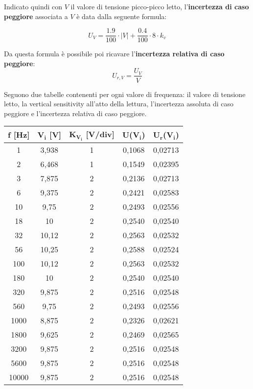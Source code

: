 Indicato quindi con $V$ il valore di tensione picco-picco letto, l'\textbf{incertezza di caso peggiore} associata a $V$ è data dalla seguente formula:

\[U_V = \frac{1.9}{100} \cdot |V| + \frac{0.4}{100} \cdot 8 \cdot k_v\]

Da questa formula è possibile poi ricavare l'\textbf{incertezza relativa di caso peggiore}:
\[U_{r,V} = \frac{U_V}{V}\]

Seguono due tabelle contenenti per ogni valore di frequenza: il valore di tensione letto, la vertical sensitivity all'atto della lettura, l'incertezza assoluta di caso peggiore e l'incertezza relativa di caso peggiore.

\begin{table}[!ht]
    \centering
    \begin{tabular}{|c|c|c|c|c|}
    \hline
        \textbf{f [Hz]} & \textbf{$\bm{V_{i}}$ [V]} & \textbf{$\bm{K_{V_i}}$ [V/div]} & \textbf{U($\bm{V_{i}}$)} & \textbf{$\bm{U_{r}}$($\bm{V_{i}}$)} \\ \hline
        1 & 3,938 & 1 & 0,1068 & 0,02713 \\ \hline
        2 & 6,468 & 1 & 0,1549 & 0,02395 \\ \hline
        3 & 7,875 & 2 & 0,2136 & 0,02713 \\ \hline
        6 & 9,375 & 2 & 0,2421 & 0,02583 \\ \hline
        10 & 9,75 & 2 & 0,2493 & 0,02556 \\ \hline
        18 & 10 & 2 & 0,2540 & 0,02540 \\ \hline
        32 & 10,12 & 2 & 0,2563 & 0,02532 \\ \hline
        56 & 10,25 & 2 & 0,2588 & 0,02524 \\ \hline
        100 & 10,12 & 2 & 0,2563 & 0,02532 \\ \hline
        180 & 10 & 2 & 0,2540 & 0,02540 \\ \hline
        320 & 9,875 & 2 & 0,2516 & 0,02548 \\ \hline
        560 & 9,75 & 2 & 0,2493 & 0,02556 \\ \hline
        1000 & 8,875 & 2 & 0,2326 & 0,02621 \\ \hline
        1800 & 9,625 & 2 & 0,2469 & 0,02565 \\ \hline
        3200 & 9,875 & 2 & 0,2516 & 0,02548 \\ \hline
        5600 & 9,875 & 2 & 0,2516 & 0,02548 \\ \hline
        10000 & 9,875 & 2 & 0,2516 & 0,02548 \\ \hline
    \end{tabular}
\end{table}

